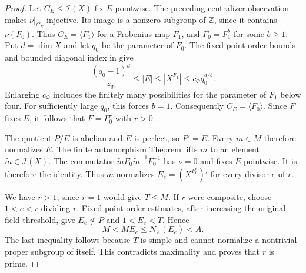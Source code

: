 \begin{proof}
Let $C_E\leq\mathcal I(X)$ fix $E$ pointwise.  The preceding
centralizer observation makes $\nu|_{C_E}$ injective.  Its image is
a nonzero subgroup of $\mathbb Z$, since it contains $\nu(F_0)$.
Thus $C_E=\langle F_1\rangle$ for a Frobenius map $F_1$, and
$F_0=F_1^b$ for some $b\geq1$.  Put $d=\dim X$ and let $q_0$ be
the parameter of $F_0$.  The fixed-point order bounds and bounded
diagonal index in \cite[Theorem~3.4(b),(d)]{LarsenPink2011} give
\[
 \frac{(q_0-1)^d}{z_\Phi}
 \leq |E|\leq |X^{F_1}|
 \leq c_\Phi q_0^{d/b}.
\]
Enlarging $c_\Phi$ includes the finitely many possibilities for the
parameter of $F_1$ below four.  For sufficiently large $q_0$, this
forces $b=1$.  Consequently $C_E=\langle F_0\rangle$.  Since $F$
fixes $E$, it follows that $F=F_0^r$ with $r>0$.

The quotient $P/E$ is abelian and $E$ is perfect, so $P'=E$.
Every $m\in M$ therefore normalizes $E$.  The finite automorphism
Theorem \cite[Theorems~30 and~36]{SteinbergNotes} lifts $m$ to an
element $\widetilde m\in\mathcal I(X)$.  The commutator
$\widetilde mF_0\widetilde m^{-1}F_0^{-1}$ has $\nu=0$ and fixes
$E$ pointwise.  It is therefore the identity.  Thus $m$ normalizes
$E_e=(X^{F_0^e})'$ for every divisor $e$ of $r$.

We have $r>1$, since $r=1$ would give $T\leq M$.  If $r$ were
composite, choose $1<e<r$ dividing $r$.  Fixed-point order estimates,
after increasing the original field threshold, give
$E_e\not\leq P$ and $1<E_e<T$.  Hence
\[
 M<ME_e\leq N_A(E_e)<A.
\]
The last inequality follows because $T$ is simple and cannot
normalize a nontrivial proper subgroup of itself.  This contradicts
maximality and proves that $r$ is prime.
\end{proof}

